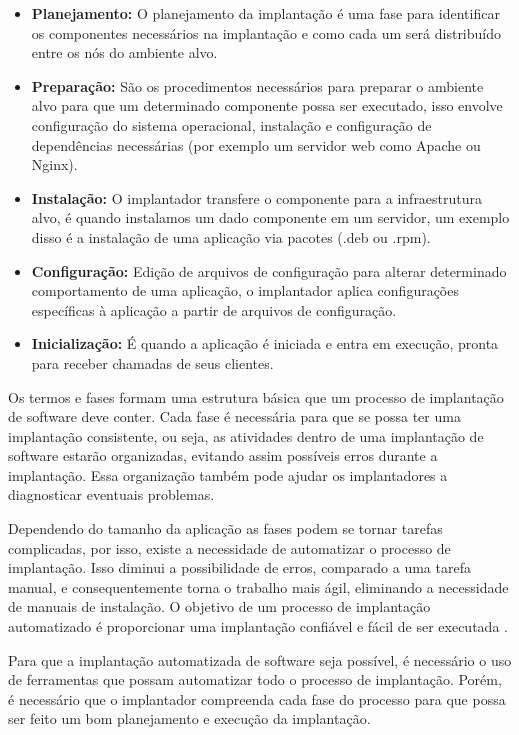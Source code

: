 \begin{itemize}
  \item  \textbf{Planejamento:} O planejamento da implantação é uma fase
  para identificar os componentes necessários na implantação e como cada um será
  distribuído entre os nós do ambiente alvo.
  \item  \textbf{Preparação:} São os procedimentos necessários para preparar o
  ambiente alvo para que um determinado componente possa ser executado, isso envolve
  configuração do sistema operacional, instalação e configuração de dependências
  necessárias (por exemplo um servidor web como Apache ou Nginx). 
  \item  \textbf{Instalação:} O implantador transfere o componente para a infraestrutura
  alvo, é quando instalamos um dado componente em um servidor, um exemplo disso
  é a instalação de uma aplicação via pacotes (.deb ou .rpm).
  \item  \textbf{Configuração:} Edição de arquivos de configuração para alterar
  determinado comportamento de uma aplicação, o implantador aplica configurações
  específicas à aplicação a partir de arquivos de configuração.
  \item  \textbf{Inicialização:} É quando a aplicação é iniciada e entra em execução,
  pronta para receber chamadas de seus clientes.
\end{itemize}

Os termos e fases formam uma estrutura básica que um processo de implantação de software
deve conter. Cada fase é necessária para que se possa ter uma implantação consistente, ou seja, as
atividades dentro de uma implantação de software estarão organizadas, evitando assim
possíveis erros durante a implantação. Essa organização também pode ajudar os 
implantadores a diagnosticar eventuais problemas.

Dependendo do tamanho da aplicação as fases podem se tornar tarefas complicadas,
por isso, existe a necessidade de automatizar o processo de implantação. Isso 
diminui a possibilidade de erros, comparado a uma tarefa manual, e consequentemente
torna o trabalho mais ágil, eliminando a necessidade de manuais de instalação. 
O objetivo de um processo de implantação automatizado é proporcionar uma implantação confiável e 
fácil de ser executada \cite{humble2010}.

Para que a implantação automatizada de software seja possível, é necessário o uso
de ferramentas que possam automatizar todo o processo de implantação. Porém, é 
necessário que o implantador compreenda cada fase do processo para que possa ser
feito um bom planejamento e execução da implantação.

